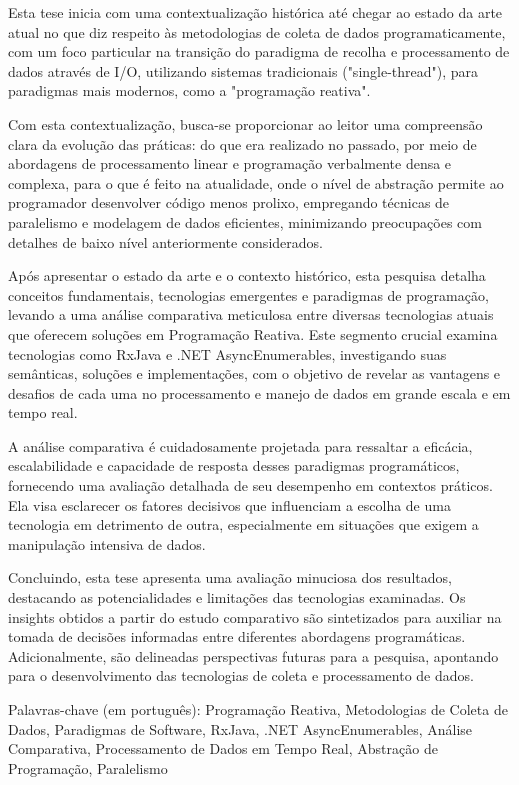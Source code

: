 \abstractPT  %

Esta tese inicia com uma contextualização histórica até chegar ao estado da arte atual no que diz respeito às metodologias de coleta de dados programaticamente, com um foco particular na transição do paradigma de recolha e processamento de dados através de I/O, utilizando sistemas tradicionais ("single-thread"), para paradigmas mais modernos, como a "programação reativa".

Com esta contextualização, busca-se proporcionar ao leitor uma compreensão clara da evolução das práticas: do que era realizado no passado, por meio de abordagens de processamento linear e programação verbalmente densa e complexa, para o que é feito na atualidade, onde o nível de abstração permite ao programador desenvolver código menos prolixo, empregando técnicas de paralelismo e modelagem de dados eficientes, minimizando preocupações com detalhes de baixo nível anteriormente considerados.

Após apresentar o estado da arte e o contexto histórico, esta pesquisa detalha conceitos fundamentais, tecnologias emergentes e paradigmas de programação, levando a uma análise comparativa meticulosa entre diversas tecnologias atuais que oferecem soluções em Programação Reativa. Este segmento crucial examina tecnologias como RxJava e .NET AsyncEnumerables, investigando suas semânticas, soluções e implementações, com o objetivo de revelar as vantagens e desafios de cada uma no processamento e manejo de dados em grande escala e em tempo real.

A análise comparativa é cuidadosamente projetada para ressaltar a eficácia, escalabilidade e capacidade de resposta desses paradigmas programáticos, fornecendo uma avaliação detalhada de seu desempenho em contextos práticos. Ela visa esclarecer os fatores decisivos que influenciam a escolha de uma tecnologia em detrimento de outra, especialmente em situações que exigem a manipulação intensiva de dados.

Concluindo, esta tese apresenta uma avaliação minuciosa dos resultados, destacando as potencialidades e limitações das tecnologias examinadas. Os insights obtidos a partir do estudo comparativo são sintetizados para auxiliar na tomada de decisões informadas entre diferentes abordagens programáticas. Adicionalmente, são delineadas perspectivas futuras para a pesquisa, apontando para o desenvolvimento das tecnologias de coleta e processamento de dados.




\begin{keywords}
Palavras-chave (em português): Programação Reativa, Metodologias de Coleta de Dados, Paradigmas de Software, RxJava, .NET AsyncEnumerables, Análise Comparativa, Processamento de Dados em Tempo Real, Abstração de Programação, Paralelismo
\end{keywords}

\vspace{1em} %
